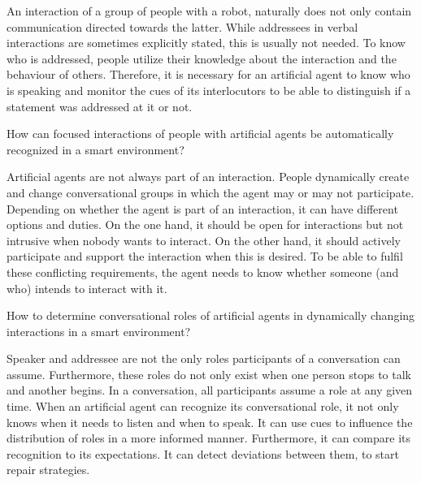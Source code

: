 \begin{hyp2}
  \label{hyp.meka}
  \hypmeka
\end{hyp2}
An interaction of a group of people with a \gls{robot}, naturally does not only contain communication directed towards the latter.
While \glspl{addressee} in verbal interactions are sometimes explicitly stated, this is usually not needed.
To know who is addressed, people utilize their knowledge about the interaction and the behaviour of others.
Therefore, it is necessary for an \gls{artificial agent} to know who is speaking and monitor the  cues of its  interlocutors to be able to distinguish if a statement was addressed at it or not.
\newcommand{\hypfformation}{How can \glspl{focused interaction} of people with \glspl{artificial agent} be automatically recognized in a \gls{smart environment}?}
\begin{hyp2}
	\label{hyp.fformation}
	\hypfformation
\end{hyp2}
Artificial agents are not always part of an interaction.
People dynamically create and change \glspl{conversational group} in which the agent may or may not participate.
Depending on whether the agent is part of an interaction, it can have different options and duties.
On the one hand, it should be open for interactions but not intrusive when nobody wants to interact.
On the other hand, it should actively participate and support the interaction when this is desired.
To be able to fulfil these conflicting requirements, the agent needs to know whether someone (and who) intends to interact with it.
\newcommand{\hyproles}{How to determine \glspl{conversational role} of \glspl{artificial agent} in dynamically changing interactions in a \gls{smart environment}?}
\begin{hyp2}
	\label{hyp.roles}
	\hyproles
\end{hyp2}
Speaker and \gls{addressee} are not the only roles participants of a \gls{conversation} can assume.
Furthermore, these roles do not only exist when one person stops to talk and another begins.
In a \gls{conversation}, all participants assume a role at any given time.
When an \gls{artificial agent} can recognize its \gls{conversational role}, it not only knows when it needs to listen and when to speak.
It can use  cues to influence the distribution of roles in a more informed manner.
Furthermore, it can compare its recognition to its expectations.
It can detect deviations between them, to start repair strategies.


